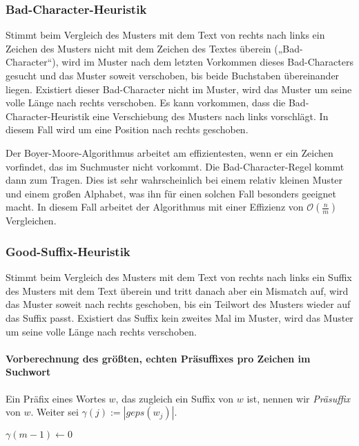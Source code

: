 \subsubsection{Bad-Character-Heuristik}
Stimmt beim Vergleich des Musters mit dem Text von rechts nach links ein Zeichen des Musters nicht mit dem Zeichen des Textes überein („Bad-Character“), wird im Muster nach dem letzten Vorkommen dieses Bad-Characters gesucht und das Muster soweit verschoben, bis beide Buchstaben übereinander liegen. Existiert dieser Bad-Character nicht im Muster, wird das Muster um seine volle Länge nach rechts verschoben. Es kann vorkommen, dass die Bad-Character-Heuristik eine Verschiebung des Musters nach links vorschlägt. In diesem Fall wird um eine Position nach rechts geschoben.

Der Boyer-Moore-Algorithmus arbeitet am effizientesten, wenn er ein Zeichen vorfindet, das im Suchmuster nicht vorkommt. Die Bad-Character-Regel kommt dann zum Tragen. Dies ist sehr wahrscheinlich bei einem relativ kleinen Muster und einem großen Alphabet, was ihn für einen solchen Fall besonders geeignet macht. In diesem Fall arbeitet der Algorithmus mit einer Effizienz von \(\mathcal{O}(\frac{n}{m})\) Vergleichen.

\subsubsection{Good-Suffix-Heuristik}
Stimmt beim Vergleich des Musters mit dem Text von rechts nach links ein Suffix des Musters mit dem Text überein und tritt danach aber ein Mismatch auf, wird das Muster soweit nach rechts geschoben, bis ein Teilwort des Musters wieder auf das Suffix passt. Existiert das Suffix kein zweites Mal im Muster, wird das Muster um seine volle Länge nach rechts verschoben.

\paragraph{Vorberechnung des größten, echten Präsuffixes pro Zeichen im Suchwort}
Ein Präfix eines Wortes \(w\), das zugleich ein Suffix von \(w\) ist, nennen wir \textit{Präsuffix} von \(w\). Weiter sei \(\gamma(j) := | geps(w_j)|\).

\begin{algorithm}[H]
	\caption{$\gamma$}

	\BlankLine

	$\gamma(m-1) \longleftarrow 0$\newline
	\BlankLine

\end{algorithm}


